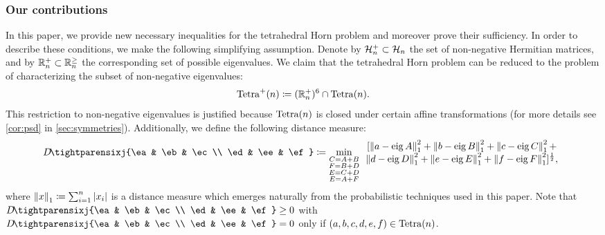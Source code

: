 \documentclass[notitlepage, 11pt, letterpaper]{amsart}
\begin{document}
\subsubsection*{Our contributions}
In this paper, we provide new necessary inequalities for the tetrahedral Horn problem and moreover prove their sufficiency.
In order to describe these conditions, we make the following simplifying assumption.
Denote by $\mathcal H^{+}_{n} \subset \mathcal H_{n}$ the set of non-negative Hermitian matrices, and by $\mathbb R^{+}_{n} \subset \mathbb R^{\geq}_{n}$ the corresponding set of possible eigenvalues.
We claim that the tetrahedral Horn problem can be reduced to the problem of characterizing the subset of non-negative eigenvalues:
\begin{equation}
    \operatorname{Tetra}^+(n) \coloneqq (\mathbb R^{+}_{n})^6 \cap \operatorname{Tetra}(n).
\end{equation}
This restriction to non-negative eigenvalues is justified because $\operatorname{Tetra}(n)$ is closed under certain affine transformations (for more details see \cref{cor:psd} in \cref{sec:symmetries}).
Additionally, we define the following distance measure:
\begin{equation}
    D\!\tightparensixj{\ea & \eb & \ec \\ \ed & \ee & \ef} \coloneqq
    \min_{\substack{C=A+B \\ F=B+D \\ E = C+D \\ E = A+F}}
    \begin{array}{c}
        [
        \norm{ \ea - \eig A }_{1}^2 + \norm{ \eb - \eig B }_{1}^2 + \norm{ \ec - \eig C }_{1}^2 + \\
        \norm{ \ed - \eig D }_{1}^2 + \norm{ \ee - \eig E }_{1}^2 + \norm{ \ef - \eig F }_{1}^2
        ]^{\frac{1}{2}},
    \end{array}
\end{equation}
where $\left\lVert x\right\rVert_{1} \coloneqq \sum_{i=1}^{n} \left|x_i\right|$ is a distance measure which emerges naturally from the probabilistic techniques used in this paper.
Note that $D\!\tightparensixj{\ea & \eb & \ec \\ \ed & \ee & \ef} \geq 0$ with $D\!\tightparensixj{\ea & \eb & \ec \\ \ed & \ee & \ef} = 0$ only if $(a, b, c, d, e, f) \in \operatorname{Tetra}(n)$.
\end{document}
